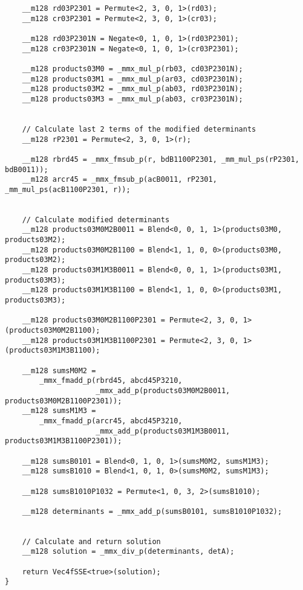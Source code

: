 \begin{verbatim}
    __m128 rd03P2301 = Permute<2, 3, 0, 1>(rd03);
    __m128 cr03P2301 = Permute<2, 3, 0, 1>(cr03);

    __m128 rd03P2301N = Negate<0, 1, 0, 1>(rd03P2301);
    __m128 cr03P2301N = Negate<0, 1, 0, 1>(cr03P2301);

    __m128 products03M0 = _mmx_mul_p(rb03, cd03P2301N);
    __m128 products03M1 = _mmx_mul_p(ar03, cd03P2301N);
    __m128 products03M2 = _mmx_mul_p(ab03, rd03P2301N);
    __m128 products03M3 = _mmx_mul_p(ab03, cr03P2301N);


    // Calculate last 2 terms of the modified determinants
    __m128 rP2301 = Permute<2, 3, 0, 1>(r);

    __m128 rbrd45 = _mmx_fmsub_p(r, bdB1100P2301, _mm_mul_ps(rP2301, bdB0011));
    __m128 arcr45 = _mmx_fmsub_p(acB0011, rP2301, _mm_mul_ps(acB1100P2301, r));


    // Calculate modified determinants
    __m128 products03M0M2B0011 = Blend<0, 0, 1, 1>(products03M0, products03M2);
    __m128 products03M0M2B1100 = Blend<1, 1, 0, 0>(products03M0, products03M2);
    __m128 products03M1M3B0011 = Blend<0, 0, 1, 1>(products03M1, products03M3);
    __m128 products03M1M3B1100 = Blend<1, 1, 0, 0>(products03M1, products03M3);

    __m128 products03M0M2B1100P2301 = Permute<2, 3, 0, 1>(products03M0M2B1100);
    __m128 products03M1M3B1100P2301 = Permute<2, 3, 0, 1>(products03M1M3B1100);

    __m128 sumsM0M2 = 
        _mmx_fmadd_p(rbrd45, abcd45P3210, 
                     _mmx_add_p(products03M0M2B0011, products03M0M2B1100P2301));
    __m128 sumsM1M3 = 
        _mmx_fmadd_p(arcr45, abcd45P3210, 
                     _mmx_add_p(products03M1M3B0011, products03M1M3B1100P2301));

    __m128 sumsB0101 = Blend<0, 1, 0, 1>(sumsM0M2, sumsM1M3);
    __m128 sumsB1010 = Blend<1, 0, 1, 0>(sumsM0M2, sumsM1M3);

    __m128 sumsB1010P1032 = Permute<1, 0, 3, 2>(sumsB1010);

    __m128 determinants = _mmx_add_p(sumsB0101, sumsB1010P1032);


    // Calculate and return solution
    __m128 solution = _mmx_div_p(determinants, detA);

    return Vec4fSSE<true>(solution);
}
\end{verbatim}




\newpage
